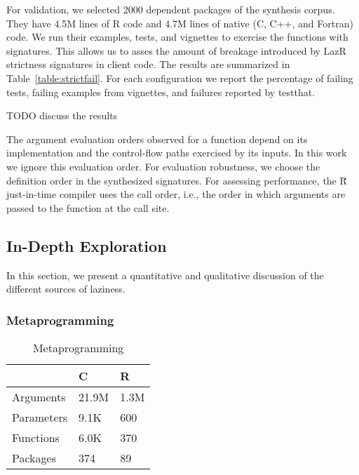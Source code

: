 \documentclass[review,nonacm,screen,acmsmall,anonymous=true]{acmart}
\newcommand{\authorcomment}[3]{}
\newcommand{\AG}[1]{\authorcomment{orange}{AG}{#1}}
\newcommand{\lazr}{{\sf LazR}\xspace}
\renewcommand{\Rsh}{{\sf\u R}\xspace}
\begin{document}
For validation, we selected 2000 dependent packages of the synthesis
corpus. They have 4.5M lines of R code and 4.7M lines of native (C, C++, and
Fortran) code. We run their examples, tests, and vignettes to exercise the
functions with signatures. This allows us to asses the amount of breakage
introduced by \lazr strictness signatures in client code. The results are
summarized in Table~\ref{table:strictfail}. For each configuration we report the
percentage of failing tests, failing examples from vignettes, and failures
reported by testthat.

TODO discuss the results

The argument evaluation orders observed for a function depend on its
implementation and the control-flow paths exercised by its inputs. In this work
we ignore this evaluation order. For evaluation robustness, we choose the
definition order in the synthesized signatures. For assessing performance, the
\Rsh just-in-time compiler uses the call order, i.e., the order in which
arguments are passed to the function at the call site.


\AG{Threats to validity: rlang has defiintion of SEXP.}


\subsection{In-Depth Exploration}\label{sec:lazr-discussion}

In this section, we present a quantitative and qualitative discussion of the
different sources of laziness.

\subsubsection{Metaprogramming}

\begin{wraptable}{r}{4cm}
  \vspace{-3mm}
  \small
  \caption{Metaprogramming} \label{table:meta}
  \centering
  \begin{tabular}{lll}
    \toprule
    &\textbf{C}&\textbf{R}\\
    \midrule
    Arguments&21.9M&1.3M\\
    Parameters&9.1K&600\\
    Functions&6.0K&370\\
    Packages&374&89\\
    \bottomrule
  \end{tabular}
\end{wraptable}
\end{document}
